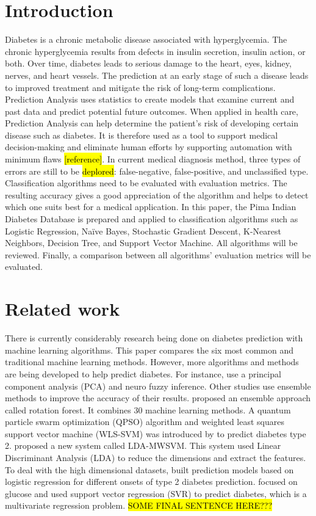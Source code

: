 \documentclass[11pt]{article}
\begin{document}
	\section{Introduction}
	Diabetes is a chronic metabolic disease associated with hyperglycemia. The chronic hyperglycemia results from defects in insulin secretion, insulin action, or both. Over time, diabetes leads to serious damage to the heart, eyes, kidney, nerves, and heart vessels. The prediction at an early stage of such a disease leads to improved treatment and mitigate the risk of long-term complications. Prediction Analysis uses statistics to create models that examine current and past data and predict potential future outcomes. When applied in health care, Prediction Analysis can help determine the patient’s risk of developing certain disease such as diabetes. It is therefore used as a tool to support medical decision-making and eliminate human efforts by supporting automation with minimum flaws \hl{[reference]}. In current medical diagnosis method, three types of errors are still to be \hl{deplored}: false-negative, false-positive, and unclassified type.	
	\bigbreak
	Classification algorithms need to be evaluated with evaluation metrics. The resulting accuracy gives a good appreciation of the algorithm and helps to detect which one suits best for a medical application. In this paper, the Pima Indian Diabetes Database \cite{Pima} is prepared and applied to classification algorithms such as Logistic Regression, Naïve Bayes, Stochastic Gradient Descent, K-Nearest Neighbors, Decision Tree, and Support Vector Machine. All algorithms will be reviewed. Finally, a comparison between all algorithms’ evaluation metrics will be evaluated.
	
	\section{Related work}
	There is currently considerably research being done on diabetes prediction with machine learning algorithms. This paper compares the six most common and traditional machine learning methods. However, more algorithms and methods are being developed to help predict diabetes. For instance, \citeauthor{POLAT2007702} \cite{POLAT2007702} use a principal component analysis (PCA) and neuro fuzzy inference. Other studies use ensemble methods to improve the accuracy of their results. \citeauthor{OZCIFT2011443} \cite{OZCIFT2011443} proposed an ensemble approach called rotation forest. It combines 30 machine learning methods. A quantum particle swarm optimization (QPSO) algorithm and weighted least squares support vector machine (WLS-SVM) was introduced by \citeauthor{Chen} to predict diabetes type 2. \citeauthor{Duygu} \cite{Duygu} proposed a new system called LDA-MWSVM. This system used Linear Discriminant Analysis (LDA) to reduce the dimensions and extract the features. To deal with the high dimensional datasets, \citeauthor{Razavian} \cite{Razavian} built prediction models based on logistic regression for different onsets of type 2 diabetes prediction. \citeauthor{Georga} \cite{Georga} focused on glucose and used support vector regression (SVR) to predict diabetes, which is a multivariate regression problem. \hl{SOME FINAL SENTENCE HERE???}
\end{document}

